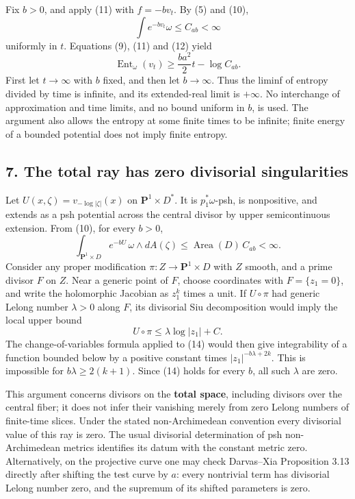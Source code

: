 \documentclass[
]{article}
\begin{document}
Fix \(b>0\), and apply (11) with \(f=-bv_t\). By (5) and (10), \[
 \int e^{-bv_t}\omega\leq C_{ab}<\infty
\] uniformly in \(t\). Equations (9), (11) and (12) yield \[
 \operatorname{Ent}_\omega(v_t)\geq\frac{ba^2}{2}t-\log C_{ab}.
 \tag{13}
\] First let \(t\to\infty\) with \(b\) fixed, and then let
\(b\to\infty\). Thus the liminf of entropy divided by time is infinite,
and its extended-real limit is \(+\infty\). No interchange of
approximation and time limits, and no bound uniform in \(b\), is used.
The argument also allows the entropy at some finite times to be
infinite; finite energy of a bounded potential does not imply finite
entropy.

\subsection{7. The total ray has zero divisorial
singularities}\label{the-total-ray-has-zero-divisorial-singularities}

Let \(U(x,\zeta)=v_{-\log|\zeta|}(x)\) on \(\mathbf P^1\times D^*\). It
is \(p_1^*\omega\)-psh, is nonpositive, and extends as a psh potential
across the central divisor by upper semicontinuous extension. From (10),
for every \(b>0\), \[
 \int_{\mathbf P^1\times D}e^{-bU}\,\omega\wedge dA(\zeta)
 \leq\operatorname{Area}(D)\,C_{ab}<\infty.
 \tag{14}
\] Consider any proper modification \(\pi:Z\to\mathbf P^1\times D\) with
\(Z\) smooth, and a prime divisor \(F\) on \(Z\). Near a generic point
of \(F\), choose coordinates with \(F=\{z_1=0\}\), and write the
holomorphic Jacobian as \(z_1^k\) times a unit. If \(U\circ\pi\) had
generic Lelong number \(\lambda>0\) along \(F\), its divisorial Siu
decomposition would imply the local upper bound \[
 U\circ\pi\leq\lambda\log|z_1|+C.
\] The change-of-variables formula applied to (14) would then give
integrability of a function bounded below by a positive constant times
\(|z_1|^{-b\lambda+2k}\). This is impossible for \(b\lambda\geq2(k+1)\).
Since (14) holds for every \(b\), all such \(\lambda\) are zero.

This argument concerns divisors on the \textbf{total space}, including
divisors over the central fiber; it does not infer their vanishing
merely from zero Lelong numbers of finite-time slices. Under the stated
non-Archimedean convention every divisorial value of this ray is zero.
The usual divisorial determination of psh non-Archimedean metrics
identifies its datum with the constant metric zero. Alternatively, on
the projective curve one may check Darvas--Xia Proposition 3.13 directly
after shifting the test curve by \(a\): every nontrivial term has
divisorial Lelong number zero, and the supremum of its shifted
parameters is zero.
\end{document}
